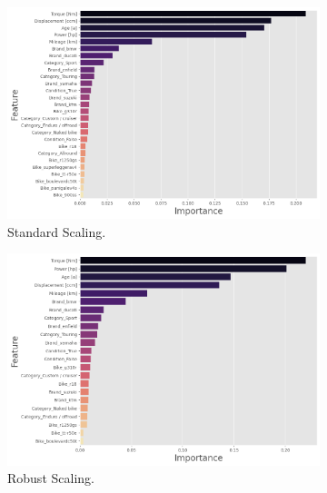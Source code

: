 \begin{figure}
    \centering
    \begin{subfigure}[b]{0.48\textwidth}
        \centering
        \includegraphics[width=\textwidth]{"content/pics/Feature_Importances_std.png"}
        \caption{Standard Scaling.}
    \end{subfigure}
    \hfill
    \begin{subfigure}[b]{0.48\textwidth}
        \centering
        \includegraphics[width=\textwidth]{"content/pics/Feature_Importances_robust.png"}
        \caption{Robust Scaling.}
    \end{subfigure}
    \vfill 
    \begin{subfigure}[b]{0.48\textwidth}
        \centering

\end{subfigure}
\end{figure}
